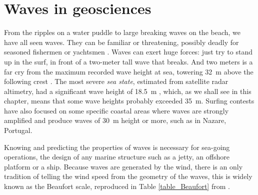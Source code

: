 \section{Waves in geosciences}
From the ripples on a water puddle to large breaking waves on the beach, we have all seen waves. 
They can be familiar or threatening, possibly deadly for seasoned fishermen or yachtsmen 
\citep[e. g. ][]{Pierson1972,Greenslade2001b}. Waves can exert huge forces: just try to stand up in the surf,
in front of a two-meter tall wave that breaks. And two meters is a far cry from the maximum recorded wave height at sea, towering
32~m above the following crest \citep{Liu&al.2008b}. The most severe \textit{sea state}, estimated from satellite radar altimetry, had a significant 
wave height of 18.5~m \citep{Hanafin&al.2012,DeCarlo&Ardhuin2024}, which, as we shall see in this chapter, 
means that some wave heights probably exceeded 35~m. Surfing contests have also focused on some specific coastal areas where waves are strongly amplified and produce waves of 30~m height or more, such as in Nazare, Portugal.

Knowing and predicting the properties of waves is necessary for sea-going operations, the design of any marine structure such as 
a jetty, an offshore platform or a ship. Because waves are generated by the wind, there is an only tradition of telling the wind speed from the geometry of the waves, this is widely known as the Beaufort scale, reproduced in Table \ref{table_Beaufort} from \cite{Alcock&Morgan1978}. 

